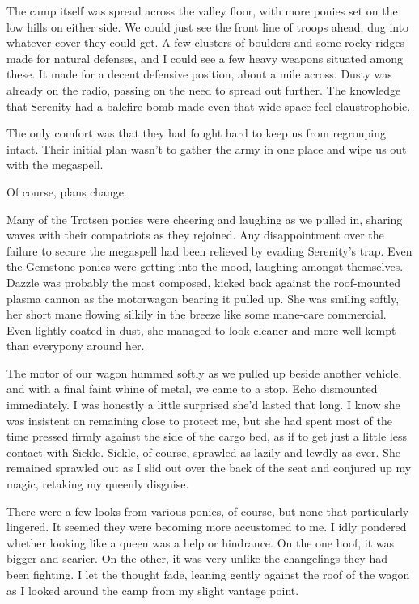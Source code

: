The camp itself was spread across the valley floor, with more ponies set on the low hills on either side. We could just see the front line of troops ahead, dug into whatever cover they could get. A few clusters of boulders and some rocky ridges made for natural defenses, and I could see a few heavy weapons situated among these. It made for a decent defensive position, about a mile across. Dusty was already on the radio, passing on the need to spread out further. The knowledge that Serenity had a balefire bomb made even that wide space feel claustrophobic.

The only comfort was that they had fought hard to keep us from regrouping intact. Their initial plan wasn’t to gather the army in one place and wipe us out with the megaspell.

Of course, plans change.

Many of the Trotsen ponies were cheering and laughing as we pulled in, sharing waves with their compatriots as they rejoined. Any disappointment over the failure to secure the megaspell had been relieved by evading Serenity’s trap. Even the Gemstone ponies were getting into the mood, laughing amongst themselves. Dazzle was probably the most composed, kicked back against the roof-mounted plasma cannon as the motorwagon bearing it pulled up. She was smiling softly, her short mane flowing silkily in the breeze like some mane-care commercial. Even lightly coated in dust, she managed to look cleaner and more well-kempt than everypony around her.

The motor of our wagon hummed softly as we pulled up beside another vehicle, and with a final faint whine of metal, we came to a stop. Echo dismounted immediately. I was honestly a little surprised she’d lasted that long. I know she was insistent on remaining close to protect me, but she had spent most of the time pressed firmly against the side of the cargo bed, as if to get just a little less contact with Sickle. Sickle, of course, sprawled as lazily and lewdly as ever. She remained sprawled out as I slid out over the back of the seat and conjured up my magic, retaking my queenly disguise.

There were a few looks from various ponies, of course, but none that particularly lingered. It seemed they were becoming more accustomed to me. I idly pondered whether looking like a queen was a help or hindrance. On the one hoof, it was bigger and scarier. On the other, it was very unlike the changelings they had been fighting. I let the thought fade, leaning gently against the roof of the wagon as I looked around the camp from my slight vantage point.

